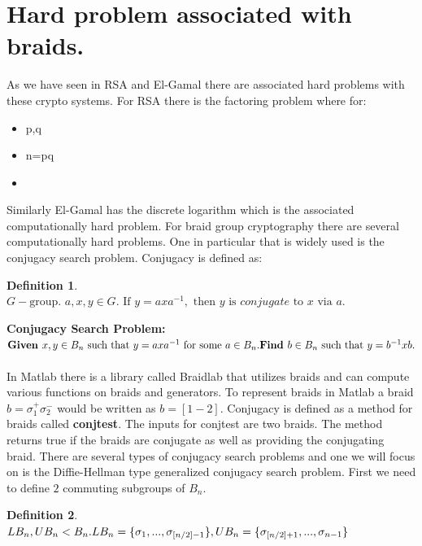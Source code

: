 \documentclass{article}
\theoremstyle{definition}
\newtheorem{definition}{Definition}[section]
\begin{document}
	 
	\section{Hard problem associated with braids.}
	As we have seen in RSA and El-Gamal there are associated hard problems with these crypto systems. For RSA there is the factoring problem where for:
	
	\begin{itemize}
		\item p,q 
		\item n=pq 
		\item {} 
	\end{itemize}

Similarly El-Gamal has the discrete logarithm which is the associated computationally hard problem. 
For braid group cryptography there are several computationally hard problems. One in particular that is widely used is the conjugacy search problem. Conjugacy is defined as:
\begin{definition} 
$G-\text{group. } a,x,y \in G. \text{ If }y=axa^{-1},\text{ then }y \text{ is } conjugate \text{ to }x \text{ via }a.$
\end{definition}

\noindent \textbf{Conjugacy Search Problem:} \\ $\textbf{Given }x,y \in B_n \text{ such that }y=axa^{-1} \text{ for some }a \in B_n. \\ \textbf{Find }b \in B_n \text{ such that }y=b^{-1}xb.$
\\ \\
In Matlab there is a library called Braidlab that utilizes braids and can compute various functions on braids and generators. To represent braids in Matlab a braid $b=\sigma_1^+\sigma_2^-$ would be written as $b=[1 -2]$. Conjugacy is defined as a method for braids called \textbf{conjtest}. The inputs for conjtest are two braids. The method returns true if the braids are conjugate as well as providing the conjugating braid. There are several types of conjugacy search problems and one we will focus on is the Diffie-Hellman type generalized conjugacy search problem. First we need to define $2$ commuting subgroups of $B_n$. 


\begin{definition}
$LB_n,UB_n < B_n. \\ LB_n=\{ \sigma_1,...,\sigma_{[n/2]-1}  \}, UB_n=\{ \sigma_{[n/2]+1},...,\sigma_{n-1}  \} $
\end{definition}
\end{document}
